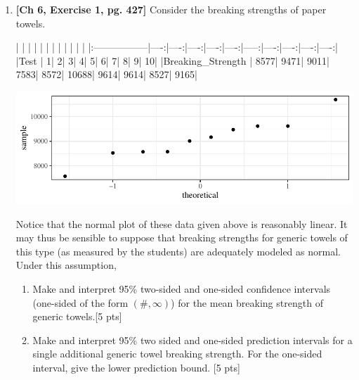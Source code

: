 \documentclass[11pt]{article}\usepackage[]{graphicx}\usepackage[]{color}
\begin{document}
\begin{enumerate}
    
 \item \textbf{[Ch 6, Exercise 1, pg. 427]} Consider the breaking strengths of paper towels.
 
\begin{Schunk}
\begin{Soutput}
|                  |     |     |     |     |     |      |     |     |     |     |
|:-----------------|----:|----:|----:|----:|----:|-----:|----:|----:|----:|----:|
|Test              |    1|    2|    3|    4|    5|     6|    7|    8|    9|   10|
|Breaking_Strength | 8577| 9471| 9011| 7583| 8572| 10688| 9614| 9614| 8527| 9165|
\end{Soutput}
\end{Schunk}
\includegraphics{stat305_hw10-003}

    Notice that the normal plot of these data given above is reasonably linear. It may thus be sensible to suppose that breaking strengths for generic towels of this type (as measured by the students) are adequately modeled as normal. Under this assumption,
          \begin{enumerate}
            \item Make and interpret 95\% two-sided and one-sided confidence intervals (one-sided of the form $(\#, \infty)$) for the mean breaking strength of generic towels.[5 pts]
            \item Make and interpret 95\% two sided and one-sided prediction intervals for a single additional generic towel breaking strength. For the one-sided interval, give the lower prediction bound. [5 pts]
          \end{enumerate}
    


\end{enumerate}
\end{document}
